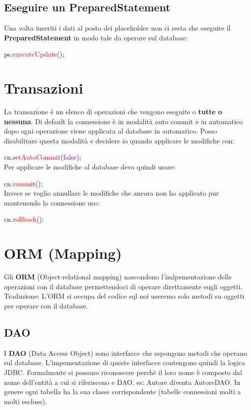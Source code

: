 \documentclass[11pt, letterpaper, titlepage]{article}
\begin{document}
\subsection{Eseguire un PreparedStatement}
Una volta inseriti i dati al posto dei placeholder non ci resta che eseguire il
\textbf{PreparedStatement} in modo tale da operare sul database:\par
\textcolor{blue}{ps}.\textcolor{red}{executeUpdate}();

\section{Transazioni}
La transazione è un elenco di operazioni che vengono eseguite o \textbf{tutte o nessuna}.
Di default la connessione è in modalità auto commit e in automatico dopo ogni operazione viene applicata al database
in automatico. Posso disabilitare questa modalità e decidere io quando applicare le modifiche con:\par
\textcolor{blue}{cn}.\textcolor{red}{setAutoCommit}(\textcolor{purple}{false});\\
Per applicare le modifiche al database devo quindi usare:\par
\textcolor{blue}{cn}.\textcolor{red}{commit}();\\
Invece se voglio annullare le modifiche che ancora non ho applicato pur mantenendo la connessione uso:\par
\textcolor{blue}{cn}.\textcolor{red}{rollback}();

\section{ORM (Mapping)}
Gli \textbf{ORM} (Object-relational mapping) nascondono l'imlpementazione delle operazioni con il database permettendoci di operare
direttamente sugli oggetti. Traduzione: L'ORM si occupa del codice sql noi useremo solo metodi su oggetti per operare con
il database.

\subsection{DAO}
I \textbf{DAO} (Data Access Object) sono interfacce che espongono metodi che operano sul database.
L'impementazione di queste interfacce contengono quindi la logica JDBC.
Formalmente si possono riconoscere perchè il loro nome è composto dal nome dell'entità a cui si
riferiscono e DAO. es: Autore diventa AutoreDAO. In genere ogni tabella ha la sua classe corrispondente
(tabelle connessioni molti a molti escluse).
\end{document}
